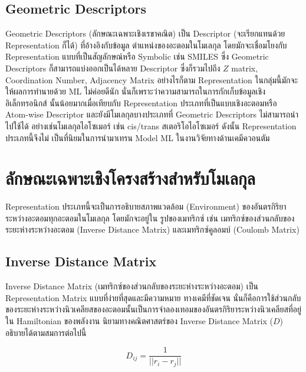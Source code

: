 \subsection{Geometric Descriptors}

Geometric Descriptors (ลักษณะเฉพาะเชิงเรขาคณิต) เป็น Descriptor (จะเรียกแทนด้วย Representation ก็ได้) ที่อ้างอิงกับข้อมูล%
ตำแหน่งของอะตอมในโมเลกุล โดยมักจะเชื่อมโยงกับ Representation แบบที่เป็นสัญลักษณ์หรือ Symbolic เช่น SMILES ซึ่ง Geometric 
Descriptors ก็สามารถแบ่งออกเป็นได้หลาย Descriptor ซึ่งก็รวมไปถึง $Z$ matrix, Coordination Number, Adjacency Matrix 
อย่างไรก็ตาม Representation ในกลุ่มนี้มักจะให้ผลการทำนายด้วย ML ไม่ค่อยดีนัก นั่นก็เพราะว่าความสามารถในการกักเก็บข้อมูลเชิงอิเล็กทรอนิกส์%
นั้นน้อยมากเมื่อเทียบกับ Representation ประเภทที่เป็นแบบเชิงอะตอมหรือ Atom-wise Descriptor และยังมีโมเลกุลบางประเภทที่ Geometric 
Descriptors ไม่สามารถนำไปใช้ได้ อย่างเช่นโมเลกุลไอโซเมอร์ เช่น cis/trans สเตอริโอไอโซเมอร์ ดังนั้น Representation ประเภทนี้จึงไม่%
เป็นที่นิยมในการนำมาเทรน Model ML ในงานวิจัยทางด้านเคมีควอนตัม\cite{keith2021,musil2021}

\section{ลักษณะเฉพาะเชิงโครงสร้างสำหรับโมเลกุล}

Representation ประเภทนี้จะเป็นการอธิบายสภาพแวดล้อม (Environment) ของอันตรกิริยาระหว่างอะตอมทุกอะตอมในโมเลกุล โดยมักจะอยู่ใน%
รูปของเมทริกซ์ เช่น เมทริกซ์ของส่วนกลับของระยะห่างระหว่างอะตอม (Inverse Distance Matrix) และเมทริกซ์คูลอมบ์ (Coulomb Matrix)

\subsection{Inverse Distance Matrix}

Inverse Distance Matrix (เมทริกซ์ของส่วนกลับของระยะห่างระหว่างอะตอม) เป็น Representation Matrix แบบที่ง่ายที่สุดและมีความหมาย%
ทางเคมีที่ชัดเจน นั่นก็คือการใช้ส่วนกลับของระยะห่างระหว่างนิวเคลียสของอะตอมนั้นเป็นการจำลองเทอมของอันตรกิริยาระหว่างนิวเคลียสที่อยู่ใน 
Hamiltonian ของพลังงาน นิยามทางคณิตศาสตร์ของ Inverse Distance Matrix ($D$) อธิบายได้ตามสมการต่อไปนี้

\begin{equation}
    D_{ij} = \frac{1}{||r_{i} - r_{j}||}
\end{equation}

